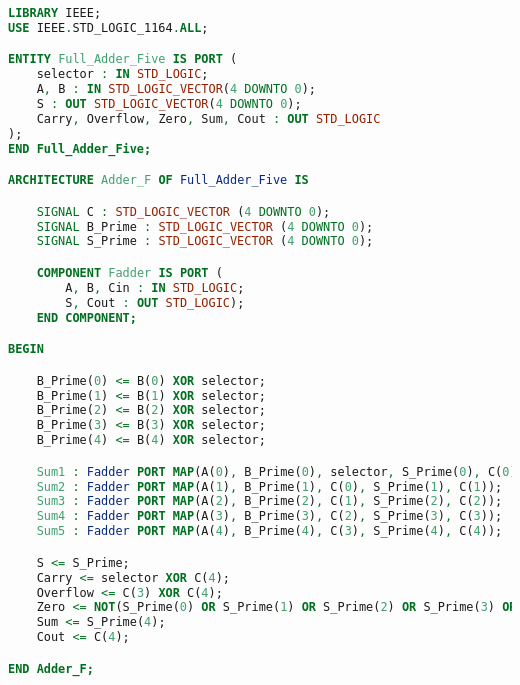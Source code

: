 \begin{lstlisting}[language={vhdl}, caption={Full adder 5}, label={Script}]
LIBRARY IEEE;
USE IEEE.STD_LOGIC_1164.ALL;

ENTITY Full_Adder_Five IS PORT (
    selector : IN STD_LOGIC;
    A, B : IN STD_LOGIC_VECTOR(4 DOWNTO 0);
    S : OUT STD_LOGIC_VECTOR(4 DOWNTO 0);
    Carry, Overflow, Zero, Sum, Cout : OUT STD_LOGIC
);
END Full_Adder_Five;

ARCHITECTURE Adder_F OF Full_Adder_Five IS

    SIGNAL C : STD_LOGIC_VECTOR (4 DOWNTO 0);
    SIGNAL B_Prime : STD_LOGIC_VECTOR (4 DOWNTO 0);
    SIGNAL S_Prime : STD_LOGIC_VECTOR (4 DOWNTO 0);

    COMPONENT Fadder IS PORT (
        A, B, Cin : IN STD_LOGIC;
        S, Cout : OUT STD_LOGIC);
    END COMPONENT;

BEGIN

    B_Prime(0) <= B(0) XOR selector;
    B_Prime(1) <= B(1) XOR selector;
    B_Prime(2) <= B(2) XOR selector;
    B_Prime(3) <= B(3) XOR selector;
    B_Prime(4) <= B(4) XOR selector;

    Sum1 : Fadder PORT MAP(A(0), B_Prime(0), selector, S_Prime(0), C(0));
    Sum2 : Fadder PORT MAP(A(1), B_Prime(1), C(0), S_Prime(1), C(1));
    Sum3 : Fadder PORT MAP(A(2), B_Prime(2), C(1), S_Prime(2), C(2));
    Sum4 : Fadder PORT MAP(A(3), B_Prime(3), C(2), S_Prime(3), C(3));
    Sum5 : Fadder PORT MAP(A(4), B_Prime(4), C(3), S_Prime(4), C(4));

    S <= S_Prime;
    Carry <= selector XOR C(4);
    Overflow <= C(3) XOR C(4);
    Zero <= NOT(S_Prime(0) OR S_Prime(1) OR S_Prime(2) OR S_Prime(3) OR S_Prime(4));
    Sum <= S_Prime(4);
    Cout <= C(4);

END Adder_F;
	\end{lstlisting}
